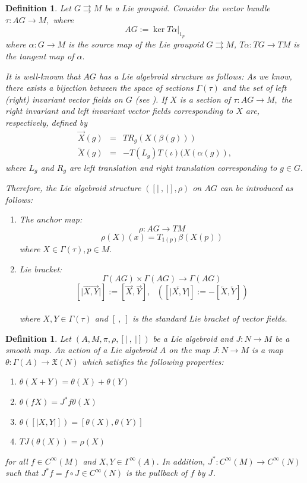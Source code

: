 \documentclass{article}
\newtheorem{definition}[theorem]{Definition}
\begin{document}
\begin{definition}
\label{associated Lie algebroid}
Let $G \rightrightarrows M $ be a Lie groupoid. Consider the vector bundle $\tau : AG \longrightarrow M,$ where 
$$AG := \ker T\alpha \vert_{1_{p}}$$
where $\alpha : G \longrightarrow M$ is the source map of the Lie groupoid $G \rightrightarrows M$, $T\alpha : TG \longrightarrow TM$ is the tangent map of $\alpha.$

It is well-known that $AG$ has a Lie algebroid structure as follows:
As we know, there exists a bijection between the space of sections $\Gamma (\tau)$ and the set of left (right) invariant vector fields on $G$ (see \cite{Mack}). 
If $X$ is a section of $\tau : AG \longrightarrow M,$ the right invariant and left invariant vector fields corresponding to $X$ are, respectively, defined by
\begin{eqnarray}
 \overrightarrow{X}(g) &=& T R_{g} ( X (\beta (g))) \nonumber  \\
 \overleftarrow{X}(g) &=& - T (L_{g} ) T (\iota) ( X (\alpha (g)),   \nonumber
\end{eqnarray}
where $L_{g}$ and $R_{g}$ are left translation and right translation corresponding to $g\in G.$  

Therefore, the Lie algebroid structure $([\vert ~,~ \vert], \rho ) $ on $AG$ can be introduced as follows:
\begin{enumerate}
\item The anchor map: 
$$ \rho: AG  \longrightarrow  TM  $$
$$ \rho(X)(x) = T_{1(p)} \beta (X(p)) $$
where $X \in \Gamma (\tau), p \in M.$
\item Lie bracket:     
 $$\Gamma (AG) \times \Gamma (AG) \longrightarrow \Gamma (AG)$$
 $$[\vert \overrightarrow{X , Y} \vert] := [ \overrightarrow{X} , \overrightarrow{Y} ], ~~~( [\vert \overleftarrow{X , Y} \vert] := - [ \overleftarrow{X} , \overleftarrow{Y} ] )$$ \\
where $ X , Y \in \Gamma (\tau)$ and $[~,~]$ is the standard Lie bracket of vector fields.
\end{enumerate}
\end{definition}

\begin{definition}
Let $ ( A, M, \pi, \rho , [\vert ~,~ \vert ] )$ be a Lie algebroid and $J : N \longrightarrow M$ be a smooth map.
An action of a Lie algebroid $A$ on the map $J : N \longrightarrow M$ is a map
$ \theta : \Gamma (A) \longrightarrow \mathfrak{X} (N) $ which satisfies the following properties:
\begin{enumerate}
\item $ \theta ( X + Y ) = \theta (X) + \theta (Y)$
\item $ \theta ( f X ) = J^{\ast} f \theta (X) $
\item $ \theta  ( [\vert X , Y \vert] ) = [ \theta (X) , \theta (Y) ]  $
\item $T J ( \theta (X) ) = \rho (X)$
\end{enumerate}
for all $ f \in C^{\infty} (M)$ and $ X, Y \in \Gamma^{\infty} (A).$ 
In addition, $J^{\ast} : C^{\infty} (M) \longrightarrow C^{\infty} (N) $ such that $J^{\ast} f = f \circ J \in C^{\infty} (N)$ is the pullback of $f$ by $J$.
\end{definition}
\end{document}
